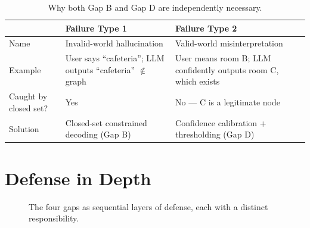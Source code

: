 \documentclass[11pt,a4paper]{article}
\begin{document}
\begin{table}[h]
\centering
\begin{tabular}{@{}p{3.6cm}p{4.5cm}p{4.5cm}@{}}
\toprule
& \textbf{Failure Type 1} & \textbf{Failure Type 2} \\
\midrule
Name & Invalid-world hallucination & Valid-world misinterpretation \\
Example & User says ``cafeteria''; LLM outputs ``cafeteria'' $\notin$ graph & User means room B; LLM confidently outputs room C, which exists \\
Caught by closed set? & Yes & No --- C is a legitimate node \\
Solution & Closed-set constrained decoding (Gap B) & Confidence calibration + thresholding (Gap D) \\
\bottomrule
\end{tabular}
\caption{Why both Gap B and Gap D are independently necessary.}
\end{table}

\section{Defense in Depth}
\label{sec:defense}

\begin{figure}[h]
\centering
{}
\caption{The four gaps as sequential layers of defense, each with a distinct responsibility.}
\end{figure}
\end{document}
